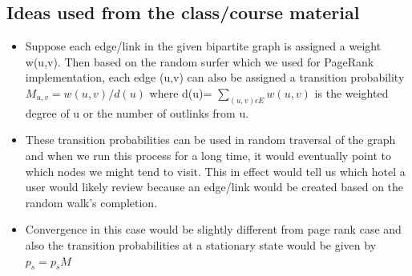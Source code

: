 \documentclass[letterpaper,twocolumn,11pt]{article}
\begin{document}
\subsection{Ideas used from the class/course material}
\begin{itemize}

\item Suppose each edge/link in the given bipartite graph is assigned a weight w(u,v). Then based on the random surfer which we used for PageRank implementation, each edge (u,v) can also be assigned a transition probability $M_{u,v} =w(u,v) / d(u)$ where d(u)= $\sum_{(u,v) \epsilon E} w(u,v)$ is the weighted degree  of u or the number of outlinks from u.

\item These transition probabilities can be used  in random traversal of the graph  and when we run this process for a long time, it would eventually point to which nodes we might tend to visit. This in effect would tell us which hotel a user would likely review because an edge/link would be created based on the random walk's completion.

\item Convergence in this case would be slightly different from page rank case and also the transition probabilities at a stationary state would be given by $p_s= p_s M$
 \end{itemize}
\end{document}
